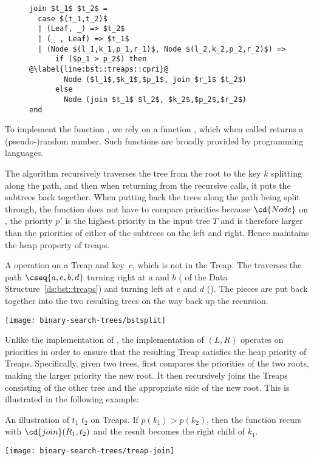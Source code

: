 \begin{chapter}
\begin{figure}
\begin{datastructure}
\begin{lstlisting}
join $t_1$ $t_2$ =
  case $(t_1,t_2)$
  | (Leaf, _) => $t_2$
  | (_ , Leaf) => $t_1$
  | (Node $(l_1,k_1,p_1,r_1)$, Node $(l_2,k_2,p_2,r_2)$) =>
      if ($p_1 > p_2$) then  @\label{line:bst::treaps::cpri}@
        Node ($l_1$,$k_1$,$p_1$, join $r_1$ $t_2$)
      else
        Node (join $t_1$ $l_2$, $k_2$,$p_2$,$r_2$)
end
\end{lstlisting}
\end{datastructure}
\end{figure}

To implement the function , we rely on a function
, which when called returns a (pseudo-)random number.
Such functions are broadly provided by programming languages.

The  algorithm recursively traverses the tree from the
root to the key $k$ splitting along the path, and then when returning
from the recursive calls, it puts the subtrees back together.  When
putting back the trees along the path being split through, the
function does not have to compare priorities because $\cd{Node}$ on
,
the priority $p'$ is the highest priority in the input tree $T$ and is
therefore larger than the priorities of either of the subtrees on the
left and right.  Hence  maintains the heap property of
treaps.

\begin{example}
A  operation on a Treap and key~$c$, which is not in the
Treap.  The  traverses the path $\cseq{a,e,b,d}$ turning
right at $a$ and $b$ ( of the Data
Structure~\ref{ds:bst::treaps}) and turning left at $e$ and $d$
().  The pieces are put back together into the two
resulting trees on the way back up the recursion.
\begin{center}
  \texttt{[image: binary-search-trees/bstsplit]}
\end{center}
\end{example}

Unlike the implementation of , the implementation of
$(L,R)$ operates on priorities in order to ensure that the
resulting Treap satisfies the heap priority of Treaps.  Specifically,
given two trees,  first compares the priorities of the two
roots, making the larger priority the new root. It then recursively
joins the Treaps consisting of the other tree and the appropriate side
of the new root.  This is illustrated in the following example:
\begin{example}
\label{ex:bst::treap-join}
An illustration of $t_1$ $t_2$ on Treaps.  
%
If $p(k_1) > p(k_2)$, then the function recurs with
$\cd{join}(R_1,t_2)$ and the result becomes the right child of
$k_1$.
\begin{center}
  \texttt{[image: binary-search-trees/treap-join]}
\end{center}
\end{example}


\end{chapter}
